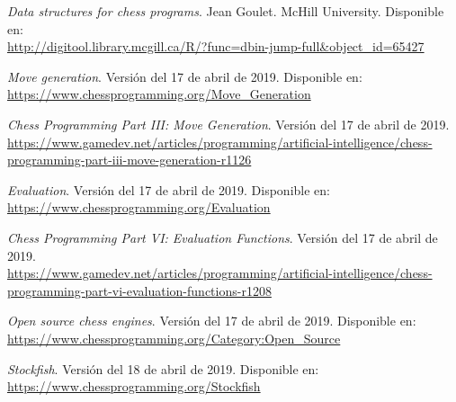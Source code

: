 \documentclass[letterpaper,12pt]{article}
\begin{document}
\begin{thebibliography}{99}
\textit{Data structures for chess programs}. Jean Goulet. McHill University. Disponible 
en: \\ \url{http://digitool.library.mcgill.ca/R/?func=dbin-jump-full&object_id=65427}

\textit{Move generation}. Versión del 17 de abril de 2019. Disponible en: \\
\url{https://www.chessprogramming.org/Move_Generation}

\textit{Chess Programming Part III: Move Generation}. Versión del 17 de abril de 2019.
\\ \url{https://www.gamedev.net/articles/programming/artificial-intelligence/chess-programming-part-iii-move-generation-r1126}

\textit{Evaluation}. Versión del 17 de abril de 2019. Disponible en: \\
\url{https://www.chessprogramming.org/Evaluation}

\textit{Chess Programming Part VI: Evaluation Functions}. Versión del 17 de abril de 2019.
\\ \url{https://www.gamedev.net/articles/programming/artificial-intelligence/chess-programming-part-vi-evaluation-functions-r1208}

\textit{Open source chess engines}. Versión del 17 de abril de 2019. Disponible en: \\
\url{https://www.chessprogramming.org/Category:Open_Source}

\textit{Stockfish}. Versión del 18 de abril de 2019. Disponible en: \\
\url{https://www.chessprogramming.org/Stockfish}

\end{thebibliography}
\end{document}
